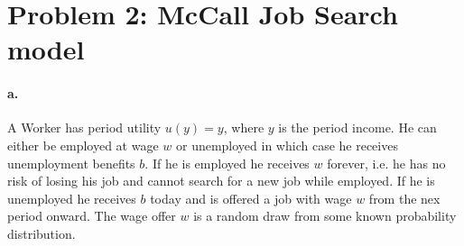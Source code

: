 
\section*{Problem 2: McCall Job Search model}
\label{problem2}

\paragraph{a.}

A Worker has period utility $u(y) = y$, where $y$ is the period income. He can
either be employed at wage $w$ or unemployed in which case he receives
unemployment benefits $b$. If he is employed he receives $w$ forever,
i.e. he has no risk of losing his job and cannot search for a new job
while employed. If he is unemployed he receives $b$ today and is offered a job
with wage $w$ from the nex period onward. The wage offer $w$ is a random draw
from some known probability distribution.

